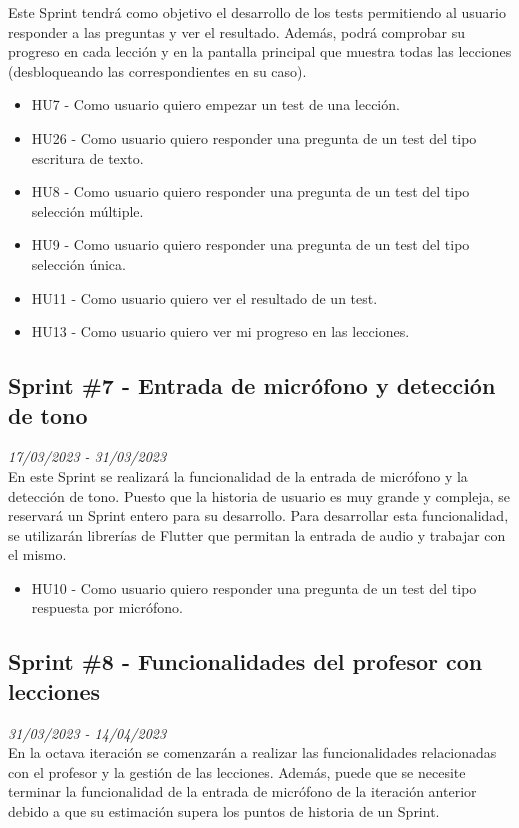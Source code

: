 Este Sprint tendrá como objetivo el desarrollo de los tests permitiendo al usuario responder a las preguntas y ver el resultado.
Además, podrá comprobar su progreso en cada lección y en la pantalla principal que muestra todas las lecciones (desbloqueando las correspondientes en su caso).
\begin{itemize}
    \item HU7 - Como usuario quiero empezar un test de una lección.
    \item HU26 - Como usuario quiero responder una pregunta de un test del tipo escritura de texto.
    \item HU8 - Como usuario quiero responder una pregunta de un test del tipo selección múltiple.
    \item HU9 - Como usuario quiero responder una pregunta de un test del tipo selección única.
    \item HU11 - Como usuario quiero ver el resultado de un test.
    \item HU13 - Como usuario quiero ver mi progreso en las lecciones.

\end{itemize}

\subsection{Sprint \#7 - Entrada de micrófono y detección de tono}
\textit{17/03/2023   -   31/03/2023}\\

En este Sprint se realizará la funcionalidad de la entrada de micrófono y la detección de tono. Puesto que la historia de usuario es muy grande y compleja, se reservará
un Sprint entero para su desarrollo. Para desarrollar esta funcionalidad, se utilizarán librerías de Flutter que permitan la entrada de audio y trabajar con el mismo.
\begin{itemize}
    \item HU10 - Como usuario quiero responder una pregunta de un test del tipo respuesta por micrófono.
\end{itemize}

\newpage
\subsection{Sprint \#8 - Funcionalidades del profesor con lecciones}
\textit{31/03/2023   -   14/04/2023}\\

En la octava iteración se comenzarán a realizar las funcionalidades relacionadas con el profesor y la gestión de las lecciones.
Además, puede que se necesite terminar la funcionalidad de la entrada de micrófono de la iteración anterior debido a que su estimación
supera los puntos de historia de un Sprint.


